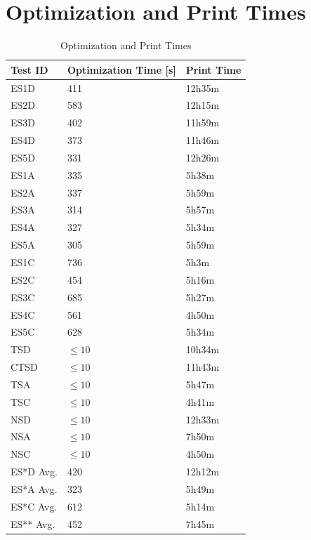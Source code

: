\section{Optimization and Print Times}


\begin{table}[htbp]
    \centering
    \caption{Optimization and Print Times}
    \label{tab:opt_and_print_time}
    \begin{tabular}{lll}
    \toprule
        Test ID & Optimization Time [s] & Print Time \\ \midrule
        ES1D & 411 & 12h35m \\
        ES2D & 583 & 12h15m \\
        ES3D & 402 & 11h59m \\
        ES4D & 373 & 11h46m \\
        ES5D & 331 & 12h26m \\ \addlinespace
        ES1A & 335 & 5h38m \\
        ES2A & 337 & 5h59m \\
        ES3A & 314 & 5h57m \\
        ES4A & 327 & 5h34m \\
        ES5A & 305 & 5h59m \\ \addlinespace
        ES1C & 736 & 5h3m \\
        ES2C & 454 & 5h16m \\
        ES3C & 685 & 5h27m \\
        ES4C & 561 & 4h50m \\
        ES5C & 628 & 5h34m \\ \midrule
        TSD & $\le10$ & 10h34m \\
        CTSD & $\le10$ & 11h43m \\
        TSA & $\le10$ & 5h47m \\
        TSC & $\le10$ & 4h41m \\ \midrule
        NSD & $\le10$ & 12h33m \\
        NSA & $\le10$ & 7h50m \\
        NSC & $\le10$ & 4h50m \\ \midrule
        ES*D Avg. & 420 & 12h12m \\ 
        ES*A Avg. & 323 & 5h49m \\ 
        ES*C Avg. & 612 & 5h14m \\ 
        ES** Avg. & 452 & 7h45m\\ 
    \bottomrule
    \end{tabular}
\end{table}


